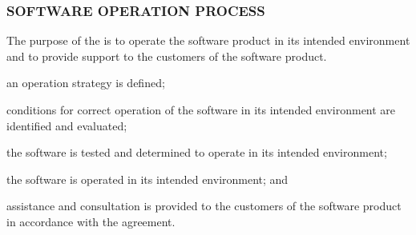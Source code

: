 		\newpage
		\subsubsection{SOFTWARE OPERATION PROCESS\label{proc:software_operation_process}}

			\begin{adjustwidth}{2em}{0pt} 
				
				The purpose of the  is to operate the software product in its intended environment and to provide support to the customers of the software product.

			\end{adjustwidth}

			\begin{adjustwidth}{2em}{0pt} 

				\begin{compactitem}

					\item an operation strategy is defined;

					\item conditions for correct operation of the software in its intended environment are identified and evaluated;

					\item the software is tested and determined to operate in its intended environment;

					\item the software is operated in its intended environment; and

					\item assistance and consultation is provided to the customers of the software product in accordance with the agreement.

				\end{compactitem}

			\end{adjustwidth}

